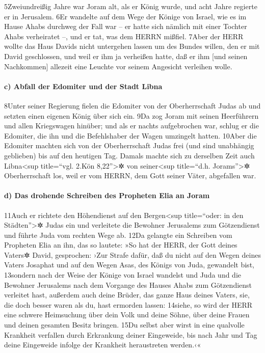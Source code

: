 5Zweiundreißig Jahre war Joram alt, als er König wurde, und acht Jahre
regierte er in Jerusalem. 6Er wandelte auf dem Wege der Könige von
Israel, wie es im Hause Ahabs durchweg der Fall war -- er hatte sich
nämlich mit einer Tochter Ahabs verheiratet --, und er tat, was dem
HERRN mißfiel. 7Aber der HERR wollte das Haus Davids nicht untergehen
lassen um des Bundes willen, den er mit David geschlossen, und weil er
ihm ja verheißen hatte, daß er ihm {[}und seinen Nachkommen{]} allezeit
eine Leuchte vor seinem Angesicht verleihen wolle.

\hypertarget{c-abfall-der-edomiter-und-der-stadt-libna}{%
\paragraph{c) Abfall der Edomiter und der Stadt
Libna}\label{c-abfall-der-edomiter-und-der-stadt-libna}}

8Unter seiner Regierung fielen die Edomiter von der Oberherrschaft Judas
ab und setzten einen eigenen König über sich ein. 9Da zog Joram mit
seinen Heerführern und allen Kriegswagen hinüber; und als er nachts
aufgebrochen war, schlug er die Edomiter, die ihn und die Befehlshaber
der Wagen umzingelt hatten. 10Aber die Edomiter machten sich von der
Oberherrschaft Judas frei (und sind unabhängig geblieben) bis auf den
heutigen Tag. Damals machte sich zu derselben Zeit auch
Libna\textless sup title=``vgl. 2.Kön 8,22''\textgreater✲ von
seiner\textless sup title=``d.h. Jorams''\textgreater✲ Oberherrschaft
los, weil er vom HERRN, dem Gott seiner Väter, abgefallen war.

\hypertarget{d-das-drohende-schreiben-des-propheten-elia-an-joram}{%
\paragraph{d) Das drohende Schreiben des Propheten Elia an
Joram}\label{d-das-drohende-schreiben-des-propheten-elia-an-joram}}

11Auch er richtete den Höhendienst auf den Bergen\textless sup
title=``oder: in den Städten''\textgreater✲ Judas ein und verleitete die
Bewohner Jerusalems zum Götzendienst und führte Juda vom rechten Wege
ab. 12Da gelangte ein Schreiben vom Propheten Elia an ihn, das so
lautete: »So hat der HERR, der Gott deines Vaters✲ David, gesprochen:
›Zur Strafe dafür, daß du nicht auf den Wegen deines Vaters Josaphat und
auf den Wegen Asas, des Königs von Juda, gewandelt bist, 13sondern nach
der Weise der Könige von Israel wandelst und Juda und die Bewohner
Jerusalems nach dem Vorgange des Hauses Ahabs zum Götzendienst verleitet
hast, außerdem auch deine Brüder, das ganze Haus deines Vaters, sie, die
doch besser waren als du, hast ermorden lassen: 14siehe, so wird der
HERR eine schwere Heimsuchung über dein Volk und deine Söhne, über deine
Frauen und deinen gesamten Besitz bringen. 15Du selbst aber wirst in
eine qualvolle Krankheit verfallen durch Erkrankung deiner Eingeweide,
bis nach Jahr und Tag deine Eingeweide infolge der Krankheit
heraustreten werden.‹«

